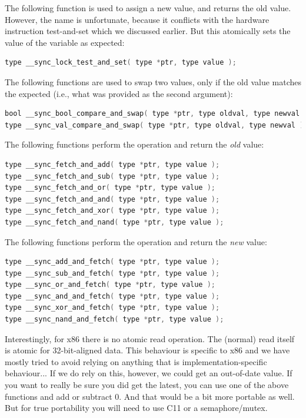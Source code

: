 \documentclass[a4paper]{report}
\begin{document}
The following function is used to assign a new value, and returns the old value. However, the name is unfortunate, because it conflicts with the hardware instruction test-and-set which we discussed earlier. But this atomically sets the value of the variable as expected:

\begin{lstlisting}[language=C]
type __sync_lock_test_and_set( type *ptr, type value );
\end{lstlisting}


The following functions are used to swap two values, only if the old value matches the expected (i.e., what was provided as the second argument):

\begin{lstlisting}[language=C]
bool __sync_bool_compare_and_swap( type *ptr, type oldval, type newval );
type __sync_val_compare_and_swap( type *ptr, type oldval, type newval );
\end{lstlisting}


The following functions perform the operation and return the \textit{old} value:
\begin{lstlisting}[language=C]
type __sync_fetch_and_add( type *ptr, type value );
type __sync_fetch_and_sub( type *ptr, type value );
type __sync_fetch_and_or( type *ptr, type value );
type __sync_fetch_and_and( type *ptr, type value );
type __sync_fetch_and_xor( type *ptr, type value );
type __sync_fetch_and_nand( type *ptr, type value );
\end{lstlisting}

The following functions perform the operation and return the \textit{new} value:
\begin{lstlisting}[language=C]
type __sync_add_and_fetch( type *ptr, type value );
type __sync_sub_and_fetch( type *ptr, type value );
type __sync_or_and_fetch( type *ptr, type value );
type __sync_and_and_fetch( type *ptr, type value );
type __sync_xor_and_fetch( type *ptr, type value );
type __sync_nand_and_fetch( type *ptr, type value );
\end{lstlisting}



Interestingly, for x86 there is no atomic read operation. The (normal) read itself is atomic for 32-bit-aligned data. This behaviour is specific to x86 and we have mostly tried to avoid relying on anything that is implementation-specific behaviour... If we do rely on this, however, we could get an out-of-date value. If you want to really be sure you did get the latest, you can use one of the above functions and add or subtract 0. And that would be a bit more portable as well. But for true portability you will need to use C11 or a semaphore/mutex.
\end{document}
